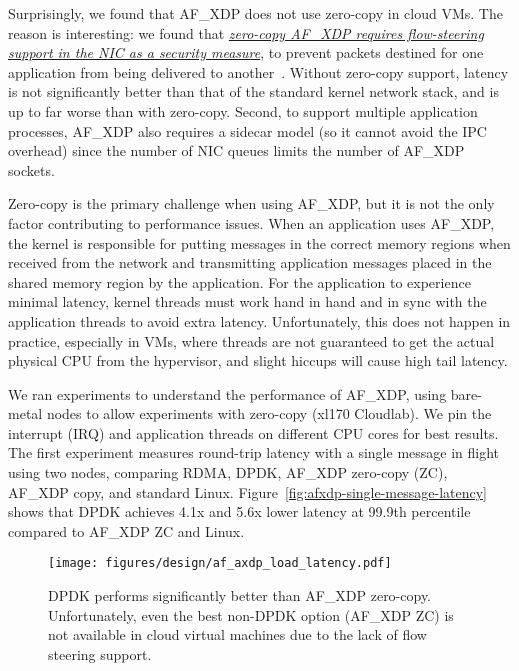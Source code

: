 Surprisingly, we found that AF\_XDP does not use zero-copy in cloud VMs.
The reason is interesting: we found that \textit{\ul{zero-copy AF\_XDP requires flow-steering support in the NIC as a security measure}}, to prevent packets destined for one application from being delivered to another~\cite{Topel2018}.
Without zero-copy support, latency is not significantly better than that of the standard kernel network stack, and is up to far worse than with zero-copy.
Second, to support multiple application processes, AF\_XDP also requires a sidecar model (so it cannot avoid the IPC overhead) since the number of NIC queues limits the number of AF\_XDP sockets.

Zero-copy is the primary challenge when using AF\_XDP, but it is not the only factor contributing to performance issues. When an application uses AF\_XDP, the kernel is responsible for putting messages in the correct memory regions when received from the network and transmitting application messages placed in the shared memory region by the application. For the application to experience minimal latency, kernel threads must work hand in hand and in sync with the application threads to avoid extra latency. Unfortunately, this does not happen in practice, especially in VMs, where threads are not guaranteed to get the actual physical CPU from the hypervisor, and slight hiccups will cause high tail latency.

We ran experiments to understand the performance of AF\_XDP, using bare-metal nodes to allow experiments with zero-copy (xl170 Cloudlab).
We pin the interrupt (IRQ) and application threads on different CPU cores for best results.
The first experiment measures round-trip latency with a single message in flight using two nodes, comparing RDMA, DPDK, AF\_XDP zero-copy (ZC), AF\_XDP copy, and standard Linux.
Figure~\ref{fig:afxdp-single-message-latency} shows that DPDK achieves 4.1x and 5.6x lower latency at 99.9th percentile compared to AF\_XDP ZC and Linux.

\begin{figure}[t!]
    \centering
    \texttt{[image: figures/design/af\_axdp\_load\_latency.pdf]}
    \caption{DPDK performs significantly better than AF\_XDP zero-copy.
    Unfortunately, even the best non-DPDK option (AF\_XDP ZC) is not available
    in cloud virtual machines due to the lack of flow steering support. }
    \label{fig:afxdp-load-latency}
    \vspace{-0.1in}
\end{figure}


